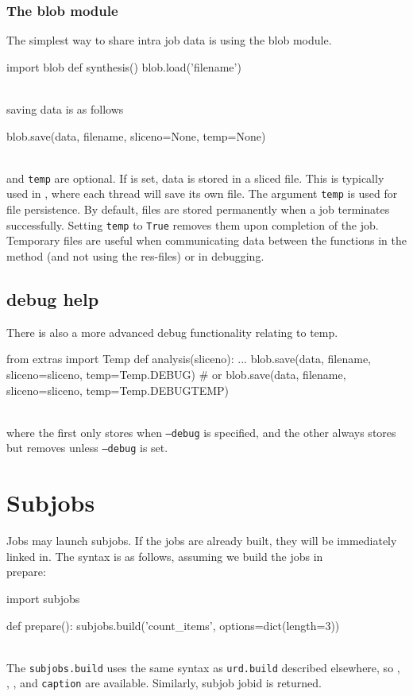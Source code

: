 \subsubsection*{The blob module}
The simplest way to share intra job data is using the blob module.
\\
\begin{python}
import blob
def synthesis()
  blob.load('filename')
\end{python}
\\
saving data is as follows
\\
\begin{python}
  blob.save(data, filename, sliceno=None, temp=None)
\end{python}
\\
\sliceno and \texttt{temp} are optional.  If \sliceno is set, data is
stored in a sliced file.  This is typically used in \analysis, where
each thread will save its own file.  The argument \texttt{temp} is
used for file persistence.  By default, files are stored permanently
when a job terminates successfully.  Setting \texttt{temp} to
\texttt{True} removes them upon completion of the job.  Temporary
files are useful when communicating data between the functions in the
method (and not using the res-files) or in debugging.


\subsection{debug help}
There is also a more advanced debug functionality relating to temp.
\\
\begin{python}
from extras import Temp
def analysis(sliceno):
  ...
  blob.save(data, filename, sliceno=sliceno, temp=Temp.DEBUG)
  # or
  blob.save(data, filename, sliceno=sliceno, temp=Temp.DEBUGTEMP)
\end{python}
\\
where the first only stores when \texttt{--debug} is specified, and
the other always stores but removes unless \texttt{--debug} is set.


\newpage
\section{Subjobs}

Jobs may launch subjobs.  If the jobs are already built, they will be
immediately linked in.  The syntax is as follows, assuming we build
the jobs in \\prepare:
\\
\begin{python}
import subjobs

def prepare():
  subjobs.build('count_items', options=dict(length=3))
\end{python}
\\
The \texttt{subjobs.build} uses the same syntax as \texttt{urd.build}
described elsewhere, so \options, \datasets, \jobids, and
\texttt{caption} are available.  Similarly, subjob jobid is returned.

